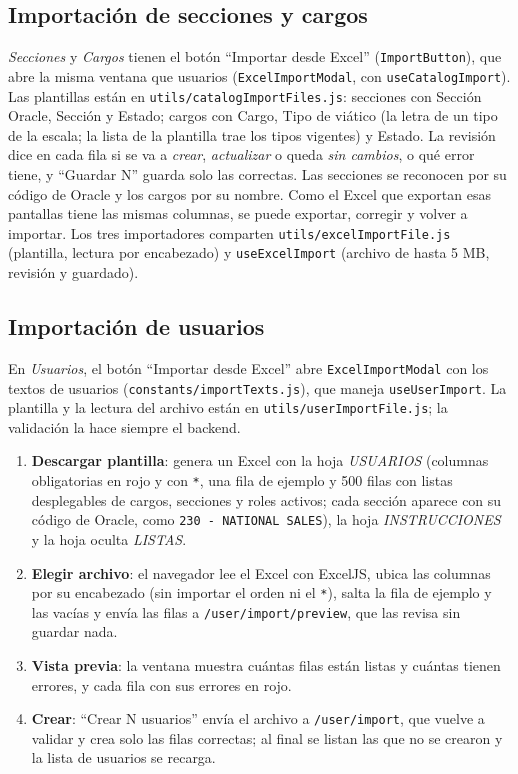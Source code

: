 \documentclass[11pt,letterpaper]{article}
\newcommand{\code}[1]{\nolinkurl{#1}}
\begin{document}
\subsection{Importación de secciones y cargos}
\emph{Secciones} y \emph{Cargos} tienen el botón ``Importar desde Excel'' (\code{ImportButton}), que abre la misma ventana que usuarios (\code{ExcelImportModal}, con \code{useCatalogImport}). Las plantillas están en \code{utils/catalogImportFiles.js}: secciones con Sección Oracle, Sección y Estado; cargos con Cargo, Tipo de viático (la letra de un tipo de la escala; la lista de la plantilla trae los tipos vigentes) y Estado. La revisión dice en cada fila si se va a \emph{crear}, \emph{actualizar} o queda \emph{sin cambios}, o qué error tiene, y ``Guardar N'' guarda solo las correctas. Las secciones se reconocen por su código de Oracle y los cargos por su nombre. Como el Excel que exportan esas pantallas tiene las mismas columnas, se puede exportar, corregir y volver a importar. Los tres importadores comparten \code{utils/excelImportFile.js} (plantilla, lectura por encabezado) y \code{useExcelImport} (archivo de hasta 5 MB, revisión y guardado).

\subsection{Importación de usuarios}
En \emph{Usuarios}, el botón ``Importar desde Excel'' abre \code{ExcelImportModal} con los textos de usuarios (\code{constants/importTexts.js}), que maneja \code{useUserImport}. La plantilla y la lectura del archivo están en \code{utils/userImportFile.js}; la validación la hace siempre el backend.

\begin{enumerate}
  \item \textbf{Descargar plantilla}: genera un Excel con la hoja \emph{USUARIOS} (columnas obligatorias en rojo y con \code{*}, una fila de ejemplo y 500 filas con listas desplegables de cargos, secciones y roles activos; cada sección aparece con su código de Oracle, como \code{230 - NATIONAL SALES}), la hoja \emph{INSTRUCCIONES} y la hoja oculta \emph{LISTAS}.
  \item \textbf{Elegir archivo}: el navegador lee el Excel con ExcelJS, ubica las columnas por su encabezado (sin importar el orden ni el \code{*}), salta la fila de ejemplo y las vacías y envía las filas a \code{/user/import/preview}, que las revisa sin guardar nada.
  \item \textbf{Vista previa}: la ventana muestra cuántas filas están listas y cuántas tienen errores, y cada fila con sus errores en rojo.
  \item \textbf{Crear}: ``Crear N usuarios'' envía el archivo a \code{/user/import}, que vuelve a validar y crea solo las filas correctas; al final se listan las que no se crearon y la lista de usuarios se recarga.
\end{enumerate}
\end{document}
